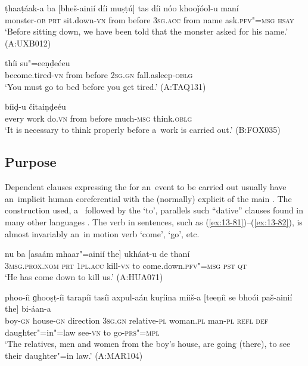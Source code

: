\begin{exe}
\ex
\label{ex:13-78}
\gll ṭhaaṭáak-a ba [bheš-ainií díi muṣṭú] tas díi nóo khooǰóol-u maní \\
monster-\textsc{ob} \textsc{prt} sit.down-\textsc{vn} from before \textsc{3sg.acc} from name ask.\textsc{pfv"=msg} \textsc{hsay} \\
\glt `Before sitting down, we have been told that the monster asked for his name.' (A:UXB012)

\ex
\label{ex:13-79}
 thíi su"=eeṇḍeéeu  \\
become.tired-\textsc{vn} from before \textsc{2sg.gn} fall.asleep-\textsc{oblg} \\
\glt `You must go to bed before you get tired.' (A:TAQ131)

\ex
\label{ex:13-80}
 bíiḍ-u čitaiṇḍeéu  \\
every work do.\textsc{vn} from before much-\textsc{msg} think.\textsc{oblg} \\
\glt `It is necessary to think properly before a~work is carried out.' (B:FOX035)
\end{exe}

\subsection{Purpose}
\label{subsec:13-4-2}

Dependent clauses expressing the  for an~event to be carried out usually have an~implicit human  coreferential with the (normally) explicit  of the main  \citep[337]{givon2001b}. The construction used, a~ followed by the  `to', parallels such ``dative''  clauses found in many other languages \citep[251--252]{thompsonetal2007}. The  verb in sentences, such as (\ref{ex:13-81})--(\ref{ex:13-82}), is almost invariably an~in motion verb `come', `go', etc.

\begin{exe}
\ex
\label{ex:13-81}
\gll nu ba [asaám mhaar"=ainií the] ukháat-u de thaní \\
\textsc{3msg.prox.nom} \textsc{prt} \textsc{1pl.acc} kill-\textsc{vn} to come.down.\textsc{pfv"=msg} \textsc{pst} \textsc{qt}  \\
\glt `He has come down to kill us.' (A:HUA071)

\ex
\label{ex:13-82}
\gll phoo-íi ɡhooṣṭ-íi tarapíi tasíi axpul-aán kuṛíina míiš-a [teeṇíi se bhoói paš-ainií the] bi-áan-a \\
boy-\textsc{gn} house-\textsc{gn} direction \textsc{3sg.gn} relative-\textsc{pl} woman.\textsc{pl}  man-\textsc{pl} \textsc{refl} \textsc{def} daughter"=in"=law see-\textsc{vn} to go-\textsc{prs"=mpl} \\
\glt `The relatives, men and women from the boy's house, are going (there), to see their daughter"=in law.' (A:MAR104) 
\end{exe}

